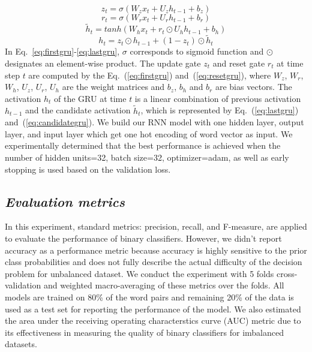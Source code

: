 \documentclass{amia}
\begin{document}
\begin{equation}
z_t = \sigma(W_zx_t + U_zh_{t-1} + b_z)
\label{eq:firstgru}
\end{equation}
\begin{equation}
r_t = \sigma(W_rx_t + U_rh_{t-1} + b_r)
\label{eq:resetgru}
\end{equation}
\begin{equation}
\tilde h_t = tanh(W_hx_t + r_t \odot U_hh_{t-1} + b_h) 
\label{eq:candidategru}
\end{equation}
\begin{equation}
h_t = z_t \odot h_{t-1} + (1-z_t) \odot \tilde h_t
\label{eq:lastgru}
\end{equation}  
In Eq.~\ref{eq:firstgru}-\ref{eq:lastgru}, $\sigma$ corresponds to sigmoid function and $\odot$ designates an element-wise product. The update gate $z_t$ and reset gate $r_t$ at time step $t$ are computed by the Eq.~(\ref{eq:firstgru}) and~(\ref{eq:resetgru}), where $W_z$, $W_r$, $W_h$, $U_z$, $U_r$, $U_h$ are the weight matrices and $b_z$, $b_h$ and $b_r$ are bias vectors. The activation $h_t$ of the GRU at time $t$ is a linear combination of previous activation $h_{t-1}$ and the candidate activation $\tilde h_t$, which is represented by Eq.~(\ref{eq:lastgru}) and~(\ref{eq:candidategru}). We build our RNN model with one hidden layer, output layer, and input layer which get one hot encoding of word vector as input. We experimentally determined that the best performance is achieved when the number of hidden units=32, batch size=32, optimizer=adam, as well as early stopping is used based on the validation loss.         
  
\subsection*{\textit{Evaluation metrics}}
In this experiment, standard metrics: precision, recall, and F-measure, are applied to evaluate the performance of binary classifiers\cite{aas1999text}. However, we didn't report accuracy as a performance metric because accuracy is highly sensitive to the prior class probabilities and does not fully describe the actual difficulty of the decision problem for unbalanced dataset. We conduct the experiment with 5 folds cross-validation and weighted macro-averaging of these metrics over the folds. All models are trained on 80\% of the word pairs and remaining 20\% of the data is used as a test set for reporting the performance of the model. We also estimated the area under the receiving operating characterstics curve (AUC) metric due to its effectiveness in measuring the quality of binary classifiers for imbalanced datasets\cite{hu2015kernelized}. 
\end{document}
